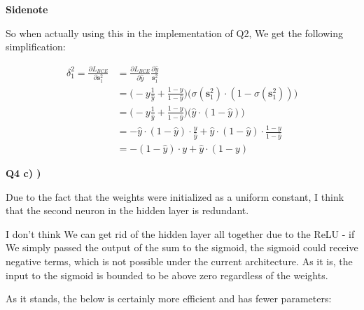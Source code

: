 \documentclass{article}
\begin{document}
	 \textbf{Sidenote}
	 
	 So when actually using this in the implementation of Q2, We get the following simplification:

	\begin{align}
	 	\delta^2_1 = \frac{\partial L_{BCE}}{\partial \mathbf{s}^2_1} &= \frac{\partial L_{BCE}}{\partial \hat{y}} \frac{\partial \hat{y}}{\mathbf{s}^2_1} \\
	 	&= \bigg( -y\frac{1}{\hat{y}}  + \frac{1-y}{1-\hat{y}} \bigg) \bigg( \sigma(\mathbf{s}^2_1)\cdot(1-\sigma(\mathbf{s}^2_1)) \bigg)\\
	 	&= \bigg( -y\frac{1}{\hat{y}}  + \frac{1-y}{1-\hat{y}} \bigg) \bigg(\hat{y}\cdot(1-\hat{y}) \bigg)\\
	 	&=  - \hat{y}\cdot(1-\hat{y})  \cdot \frac{y}{\hat{y}}  + \hat{y}\cdot(1-\hat{y}) \cdot \frac{1-y}{1-\hat{y}} \\
	 	&=  - (1-\hat{y})  \cdot y + \hat{y} \cdot (1-y)
	 \end{align}
	 
\textbf{Q4 c) )}

	Due to the fact that the weights were initialized as a uniform constant, I think that the second neuron in the hidden layer is redundant.
	
	I don't think We can get rid of the hidden layer all together due to the ReLU - if We simply passed the output of the sum to the sigmoid, the sigmoid could receive negative terms, which is not possible under the current architecture. As it is, the input to the sigmoid is bounded to be above zero regardless of the weights.
	
	As it stands, the below is certainly more efficient and has fewer parameters:
	 
\end{document}
